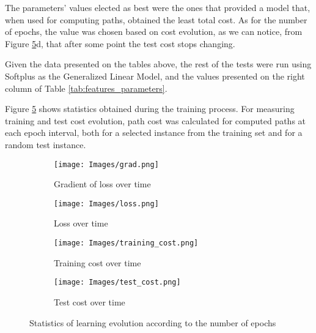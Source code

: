 The parameters' values elected as best were the ones that provided a model that, when used for computing paths, obtained the least total cost. As for the number of epochs, the value was chosen based on cost evolution, as we can notice, from Figure \ref{fig:loss_graph}d, that after some point the test cost stops changing.

Given the data presented on the tables above, the rest of the tests were run using Softplus as the Generalized Linear Model, and the values presented on the right column of Table \ref{tab:features_parameters}.

Figure \ref{fig:loss_graph} shows statistics obtained during the training process. For measuring training and test cost evolution, path cost was calculated for computed paths at each epoch interval, both for a selected instance from the training set and for a random test instance.


\begin{figure}[!ht]
    \centering
    \begin{subfigure}[b]{0.3\textwidth}
        \texttt{[image: Images/grad.png]}
        \caption{Gradient of loss over time}
        \label{fig:grad_loss}
    \end{subfigure}
    \hspace{0.01\textwidth}
    \begin{subfigure}[b]{0.3\textwidth}
        \texttt{[image: Images/loss.png]}
        \caption{Loss over time}
        \label{fig:loss}
    \end{subfigure}

    \vspace{0.5cm}

    \begin{subfigure}[b]{0.3\textwidth}
        \texttt{[image: Images/training\_cost.png]}
        \caption{Training cost over time}
        \label{fig:training_cost}
    \end{subfigure}
    \hspace{0.01\textwidth}
    \begin{subfigure}[b]{0.3\textwidth}
        \texttt{[image: Images/test\_cost.png]}
        \caption{Test cost over time}
        \label{fig:test_cost}
    \end{subfigure}
    
    \caption{Statistics of learning evolution according to the number of epochs}
    \label{fig:loss_graph}
\end{figure}

